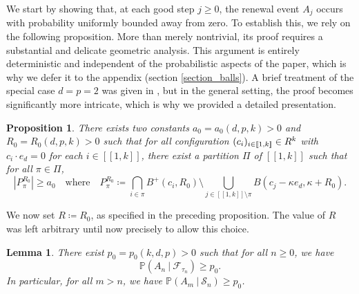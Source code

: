 \documentclass[a4paper, 11pt]{article}
\theoremstyle{plain}
\newtheorem{Lemma}[Theorem]{Lemma}
\newtheorem{Proposition}[Theorem]{Proposition}
\theoremstyle{definition}
\newcommand{\R}{\mathbb{R}}
\renewcommand{\P}{\mathbb{P}}
\newcommand{\range}[2]{[\![#1,#2]\!]}
\numberwithin{equation}{section}
\begin{document}
We start by showing that, at each good step $j\geq0$, the renewal event $A_j$ occurs with probability uniformly bounded away from zero. To establish this, we rely on the following proposition. More than merely nontrivial, its proof requires a substantial and delicate geometric analysis. This argument is entirely deterministic and independent of the probabilistic aspects of the paper, which is why we defer it to the appendix (section \ref{section_balls}). A brief treatment of the special case $d=p=2$ was given in \cite{Dsf2d}, but in the general setting, the proof becomes significantly more intricate, which is why we provided a detailed presentation.


\begin{Proposition}
    \label{prop_combinatorial}
    There exists two constants $a_0=a_0(d, p, k)>0$ and $R_0=R_0(d, p, k)>0$ such that for all configuration $(c_i)_{i\in\range{1}{k}}\in\mathbb\R^k$ with $c_i\cdot e_d=0$ for each $i\in\range{1}{k}$, there exist a partition $\Pi$ of $\range{1}{k}$ such that for all $\pi\in\Pi$,
        \[|P_\pi^{R_0}|\geq a_0\quad\text{where}\quad P_\pi^{R_0}\coloneqq\bigcap_{i\in\pi} B^+(c_i, R_0)\setminus\bigcup_{j\in\range{1}{k}\setminus\pi} B(c_j-\kappa e_d, \kappa+R_0).\]
\end{Proposition}


We now set $R\coloneqq R_0$, as specified in the preceding proposition. The value of $R$ was left arbitrary until now precisely to allow this choice.


\begin{Lemma}
    \label{lemma_renewalproba}
    There exist $p_0=p_0(k, d, p)>0$ such that for all $n\geq0$, we have
        \[\P(A_n~|~\mathcal F_{\tau_n})\geq p_0.\]
    In particular, for all $m>n$, we have $\P(A_m~|~\mathcal S_n)\geq p_0$.
\end{Lemma}
\end{document}

